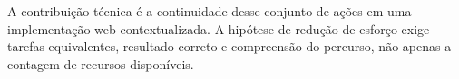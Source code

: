 \endgroup
A contribuição técnica é a continuidade desse conjunto de ações em uma implementação web contextualizada. A hipótese de redução de esforço exige tarefas equivalentes, resultado correto e compreensão do percurso, não apenas a contagem de recursos disponíveis.
